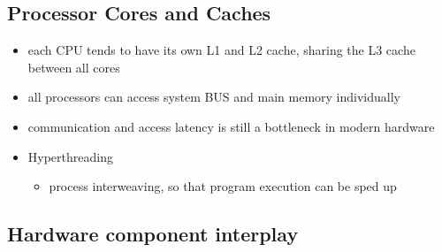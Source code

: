 \hypertarget{processor-cores-and-caches}{%
\subsection{Processor Cores and
Caches}\label{processor-cores-and-caches}}

\begin{itemize}
\item
  each CPU tends to have its own L1 and L2 cache, sharing the L3 cache
  between all cores
\item
  all processors can access system BUS and main memory individually
\item
  communication and access latency is still a bottleneck in modern
  hardware
\item
  Hyperthreading

  \begin{itemize}
  \tightlist
  \item
    process interweaving, so that program execution can be sped up
  \end{itemize}
\end{itemize}

\hypertarget{hardware-component-interplay}{%
\subsection{Hardware component
interplay}\label{hardware-component-interplay}}

